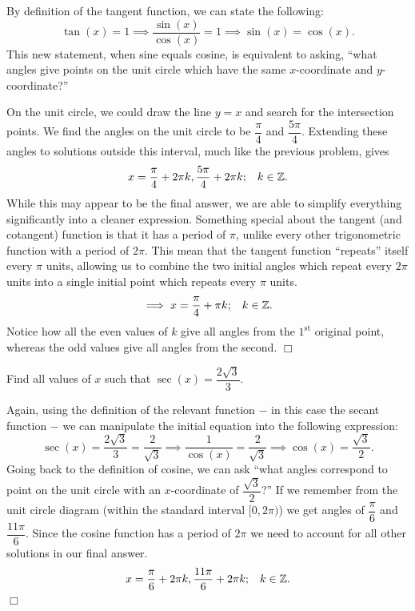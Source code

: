 \documentclass[lang=en,11pt]{elegantbook}
\begin{document}
\begin{solution}
By definition of the tangent function, we can state the following: $$\tan(x)=1\implies \dfrac{\sin(x)}{\cos(x)}=1 \implies \sin(x)=\cos(x).$$ 
This new statement, when sine equals cosine, is equivalent to asking, “what angles give points on the unit circle which have the same $x$-coordinate and $y$-coordinate?”

On the unit circle, we could draw the line $y=x$ and search for the intersection points. We find the angles on the unit circle to be $\dfrac{\pi}{4}$ and $\dfrac{5\pi}{4}$. Extending these angles to solutions outside this interval, much like the previous problem, gives $$x=\dfrac{\pi}{4}+2\pi k,\dfrac{5\pi}{4}+2\pi k;\hspace{3mm} k\in\mathbb{Z}.$$ While this may appear to be the final answer, we are able to simplify everything significantly into a cleaner expression. Something special about the tangent (and cotangent) function is that it has a period of $\pi$, unlike every other trigonometric function with a period of $2\pi$. This mean that the tangent function “repeats” itself every $\pi$ units, allowing us to combine the two initial angles which repeat every $2\pi$ units into a single initial point which repeats every $\pi$ units. $$\implies x=\dfrac{\pi}{4}+\pi k;\hspace{3mm} k\in\mathbb{Z}.$$ Notice how all the even values of $k$ give all angles from the $1^\text{st}$ original point, whereas the odd values give all angles from the second. $\Box$
\end{solution}
\begin{example}
Find all values of $x$ such that $\sec(x)=\dfrac{2\sqrt{3}}{3}$.
\end{example}
\begin{solution}
Again, using the definition of the relevant function $-$ in this case the secant function $-$ we can manipulate the initial equation into the following expression: $$\sec(x)=\dfrac{2\sqrt{3}}{3}=\dfrac{2}{\sqrt{3}} \implies \dfrac{1}{\cos(x)}=\dfrac{2}{\sqrt{3}}\implies \cos(x)=\dfrac{\sqrt{3}}{2}.$$ Going back to the definition of cosine, we can ask “what angles correspond to point on the unit circle with an $x$-coordinate of $\dfrac{\sqrt{3}}{2}$?” If we remember from the unit circle diagram (within the standard interval $[0,2\pi)$) we get angles of $\dfrac{\pi}{6}$ and $\dfrac{11\pi}{6}$. Since the cosine function has a period of $2\pi$ we need to account for all other solutions in our final answer. $$x=\dfrac{\pi}{6}+2\pi k,\dfrac{11\pi}{6}+2\pi k; \hspace{3mm} k\in\mathbb{Z}.$$ $\Box$
\end{solution}
\end{document}
